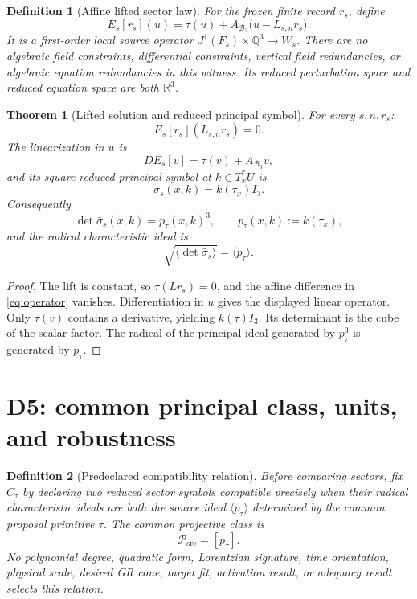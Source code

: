 \documentclass[11pt]{article}
\newtheorem{definition}{Definition}
\newtheorem{theorem}{Theorem}
\newcommand{\Bthree}{\mathcal B_3}
\newcommand{\Psrc}{\mathcal P_{\mathrm{src}}}
\newcommand{\RR}{\mathbb R}
\newcommand{\QQ}{\mathbb Q}
\begin{document}
\begin{definition}[Affine lifted sector law]
For the frozen finite record \(r_s\), define
\begin{equation}
 E_s[r_s](u)
 =
 \tau(u)+A_{\Bthree}\bigl(u-L_{s,n}r_s\bigr).
 \label{eq:operator}
\end{equation}
It is a first-order local source operator
\(J^1(F_s)\times\QQ^3\to W_s\). There are no algebraic field constraints,
differential constraints, vertical field redundancies, or algebraic equation
redundancies in this witness. Its reduced perturbation space and reduced
equation space are both \(\RR^3\).
\end{definition}

\begin{theorem}[Lifted solution and reduced principal symbol]
\label{thm:symbol}
For every \(s,n,r_s\):
\[
 E_s[r_s](L_{s,n}r_s)=0.
\]
The linearization in \(u\) is
\[
  D E_s[v]=\tau(v)+A_{\Bthree}v,
\]
and its square reduced principal symbol at \(k\in T_x^*U\) is
\[
  \bar\sigma_s(x,k)=k(\tau_x)I_3.
\]
Consequently
\[
  \det\bar\sigma_s(x,k)=p_\tau(x,k)^3,\qquad
  p_\tau(x,k):=k(\tau_x),
\]
and the radical characteristic ideal is
\[
  \sqrt{\langle\det\bar\sigma_s\rangle}
  =\langle p_\tau\rangle.
\]
\end{theorem}

\begin{proof}
The lift is constant, so \(\tau(Lr_s)=0\), and the affine difference in
\eqref{eq:operator} vanishes. Differentiation in \(u\) gives the displayed
linear operator. Only \(\tau(v)\) contains a derivative, yielding
\(k(\tau)I_3\). Its determinant is the cube of the scalar factor. The radical
of the principal ideal generated by \(p_\tau^3\) is generated by \(p_\tau\).
\end{proof}

\section{D5: common principal class, units, and robustness}

\begin{definition}[Predeclared compatibility relation]
Before comparing sectors, fix \(C_\tau\) by declaring two reduced sector
symbols compatible precisely when their radical characteristic ideals are
both the source ideal \(\langle p_\tau\rangle\) determined by the common
proposal primitive \(\tau\). The common projective class is
\[
  \Psrc=[p_\tau].
\]
No polynomial degree, quadratic form, Lorentzian signature, time orientation,
physical scale, desired GR cone, target fit, activation result, or adequacy
result selects this relation.
\end{definition}
\end{document}
